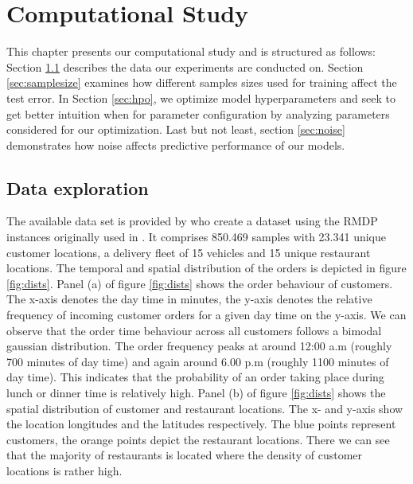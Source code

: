 \chapter{Computational Study}\label{chap:comp}

This chapter presents our computational study and is structured as follows: 
Section \ref{sec:data} describes the data our experiments are conducted on.
Section \ref{sec:samplesize} examines how different samples sizes used for training affect the test error.
In Section \ref{sec:hpo}, we optimize model hyperparameters and seek to get better intuition when for parameter configuration by analyzing parameters considered for our optimization.
Last but not least, section \ref{sec:noise} demonstrates how noise affects predictive performance of our models.

\section{Data exploration}\label{sec:data}
The available data set is provided by \cite{Hildebrandt2020_EAT} who create a dataset using the RMDP instances originally used in \cite{UlmerRMDP}. It comprises 850.469 samples with 23.341 unique customer locations, a delivery fleet of 15 vehicles and 15 unique restaurant locations. The temporal and spatial distribution of the orders is depicted in figure \ref{fig:dists}. 
Panel (a) of figure \ref{fig:dists} shows the order behaviour of customers. The x-axis denotes the day time in minutes, the y-axis denotes the relative frequency of incoming customer orders for a given day time on the y-axis. We can observe that the order time behaviour across all customers follows a bimodal gaussian distribution. The order frequency peaks at around 12:00 a.m (roughly 700 minutes of day time) and again around 6.00 p.m (roughly 1100 minutes of day time). This indicates that the probability of an order taking place during lunch or dinner time is relatively high.  
Panel (b) of figure \ref{fig:dists} shows the spatial distribution of customer and restaurant locations. The x- and y-axis show the location longitudes and the latitudes respectively. The blue points represent customers, the orange points depict the restaurant locations. There we can see that the majority of restaurants is located where the density of customer locations is rather high. 
